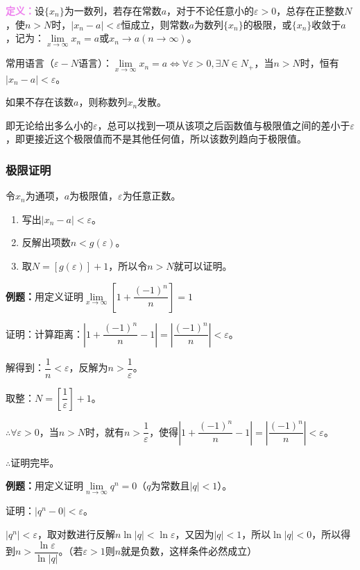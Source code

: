 \documentclass[UTF8, 12pt]{ctexart}
\begin{document}
\textcolor{violet}{\textbf{定义：}}设$\{x_n\}$为一数列，若存在常数$a$，对于不论任意小的$\varepsilon>0$，总存在正整数$N$，使$n>N$时，$\vert x_n-a\vert<\varepsilon$恒成立，则常数$a$为数列$\{x_n\}$的极限，或$\{x_n\}$收敛于$a$，记为：$\lim\limits_{x\to\infty}x_n=a$或$x_n\to a(n\to\infty)$。

常用语言（$\varepsilon-N$语言）：$\lim\limits_{x\to\infty}x_n=a\Leftrightarrow\forall\varepsilon>0,\exists N\in N_+$，当$n>N$时，恒有$\vert x_n-a\vert<\varepsilon$。

如果不存在该数$a$，则称数列$x_n$发散。

即无论给出多么小的$\varepsilon$，总可以找到一项从该项之后函数值与极限值之间的差小于$\varepsilon$，即更接近这个极限值而不是其他任何值，所以该数列趋向于极限值。

\subsubsection{极限证明}

令$x_n$为通项，$a$为极限值，$\varepsilon$为任意正数。

\begin{enumerate}
    \item 写出$\vert x_n-a|<\varepsilon$。
    \item 反解出项数$n<g(\varepsilon)$。
    \item 取$N=[g(\varepsilon)]+1$，所以令$n>N$就可以证明。
\end{enumerate}

\textbf{例题：}用定义证明$\lim\limits_{x\to\infty}\left[1+\dfrac{(-1)^n}{n}\right]=1$

证明：计算距离：$\left\vert 1+\dfrac{(-1)^n}{n}-1\right\vert=\left\vert\dfrac{(-1)^n}{n}\right\vert<\varepsilon$。

解得到：$\dfrac{1}{n}<\varepsilon$，反解为$n>\dfrac{1}{\varepsilon}$。

取整：$N=\left[\dfrac{1}{\varepsilon}\right]+1$。

$\therefore\forall\varepsilon>0$，当$n>N$时，就有$n>\dfrac{1}{\varepsilon}$，使得$\left\vert 1+\dfrac{(-1)^n}{n}-1\right\vert=\left\vert\dfrac{(-1)^n}{n}\right\vert<\varepsilon$。

$\therefore$证明完毕。

\textbf{例题：}用定义证明$\lim\limits_{n\to\infty}q^n=0$（$q$为常数且$\vert q\vert<1$）。

证明：$\vert q^n-0\vert<\varepsilon$。

$\vert q^n\vert<\varepsilon$，取对数进行反解$n\ln\vert q\vert<\ln\varepsilon$，又因为$\vert q\vert<1$，所以$\ln\vert q\vert<0$，所以得到$n>\dfrac{\ln\varepsilon}{\ln\vert q\vert}$。（若$\varepsilon>1$则$n$就是负数，这样条件必然成立）
\end{document}
